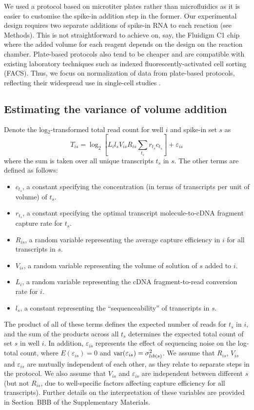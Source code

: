 \documentclass{article}
\begin{document}
We used a protocol based on microtiter plates rather than microfluidics as it is easier to customise the spike-in addition step in the former.
Our experimental design requires two separate additions of spike-in RNA to each reaction (see Methods).
This is not straightforward to achieve on, say, the Fluidigm C1 chip where the added volume for each reagent depends on the design on the reaction chamber.
Plate-based protocols also tend to be cheaper and are compatible with existing laboratory techniques such as indexed fluorescently-activated cell sorting (FACS).
Thus, we focus on normalization of data from plate-based protocols, reflecting their widespread use in single-cell studies \cite{segerstople2016single,islam2011characterization,wilson2015combined}.

\subsection{Estimating the variance of volume addition}
Denote the log$_2$-transformed total read count for well $i$ and spike-in set $s$ as
\[
T_{is} = \log_2 \left[ L_i l_s V_{is} R_{is} \sum_{t_s} r_{t_s} c_{t_s} \right] + \varepsilon_{is}
\]
where the sum is taken over all unique transcripts $t_s$ in $s$.
The other terms are defined as follows:
\begin{itemize}
    \item $c_{t_s}$, a constant specifying the concentration (in terms of transcripts per unit of volume) of $t_s$.
    \item $r_{t_s}$, a constant specifying the optimal transcript molecule-to-cDNA fragment capture rate for $t_s$.
    \item $R_{is}$, a random variable representing the average capture efficiency in $i$ for all transcripts in $s$.
    \item $V_{is}$, a random variable representing the volume of solution of $s$ added to $i$.
    \item $L_i$, a random variable representing the cDNA fragment-to-read conversion rate for $i$.
    \item $l_s$, a constant representing the ``sequenceability'' of transcripts in $s$.
\end{itemize}
The product of all of these terms defines the expected number of reads for $t_s$ in $i$, and the sum of the products across all $t_s$ determines the expected total count of set $s$ in well $i$.
In addition, $\varepsilon_{is}$ represents the effect of sequencing noise on the log-total count, where $E(\varepsilon_{is})=0$ and $\mbox{var}(\varepsilon_{is})= \sigma^2_{lib(s)}$.
We assume that $R_{is}$, $V_{is}$ and $\varepsilon_{is}$ are mutually independent of each other, as they relate to separate steps in the protocol.
We also assume that $V_{is}$ and $\varepsilon_{is}$ are independent between different $s$ (but not $R_{is}$, due to well-specific factors affecting capture efficiency for all transcripts).
Further details on the interpretation of these variables are provided in Section~BBB of the Supplementary Materials.
\end{document}
